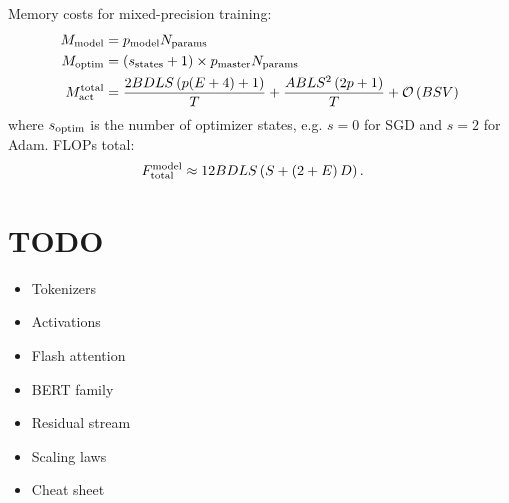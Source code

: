 \documentclass[11pt]{article}
\begin{document}
Memory costs for mixed-precision training:
\begin{align}
    M _{ {\rm model} } &=p _{ {\rm model} } N _{ {\rm params} } \nonumber\\
    M _{ {\rm optim} }  &=  \left ( s _{ {\rm states} }+1 \right) \times p _{ {\rm master } } N _{ {\rm params} } \nonumber\\
    M _{ {\rm act}  } ^{ {\rm  total}  } & =\frac{ 2BDLS   \left ( p(E+4) + 1   \right ) }{ T }
    + \frac{ ABLS ^{ 2 } \left ( 2p+1\right ) }{ T }  + \mathcal{O} \left( BSV \right)
\end{align}
where $ s _{ {\rm  optim} } $ is the number of optimizer states, e.g. $ s=0 $ for SGD and $ s=2 $
for Adam. FLOPs total:
\begin{align}
    F _{ {\rm total}  } ^{ {\rm  model}  } &\approx 12 BDLS \left ( S + \left ( 2+E \right )D \right ) .
\end{align}


 \section{TODO}

 \begin{itemize}
 \item Tokenizers
 \item Activations
 \item Flash attention
 \item BERT family
 \item Residual stream
 \item Scaling laws
 \item Cheat sheet
 \end{itemize}



\end{document}
